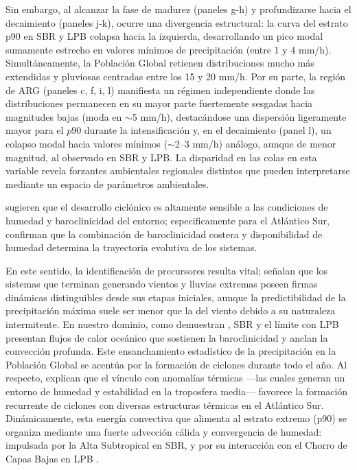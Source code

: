 Sin embargo, al alcanzar la fase de madurez (paneles g-h) y profundizarse hacia el decaimiento (paneles j-k), ocurre una divergencia estructural: la curva del estrato p90 en SBR y LPB colapsa hacia la izquierda, desarrollando un pico modal sumamente estrecho en valores mínimos de precipitación (entre 1 y 4 mm/h). 
Simultáneamente, la Población Global retienen distribuciones mucho más extendidas y pluviosas centradas entre los 15 y 20 mm/h. 
Por su parte, la región de ARG (paneles c, f, i, l) manifiesta un régimen independiente donde las distribuciones permanecen en su mayor parte fuertemente sesgadas hacia magnitudes bajas (moda en $\sim$5 mm/h), destacándose una dispersión ligeramente mayor para el $p90$ durante la intensificación y, en el decaimiento (panel l), un colapso modal hacia valores mínimos ($\sim$2--3 mm/h) análogo, aunque de menor magnitud, al observado en SBR y LPB.
La disparidad en las colas en esta variable revela forzantes ambientales regionales distintos que pueden interpretarse mediante un espacio de parámetros ambientales. 


\citet{yanase2014parameter} sugieren que el desarrollo ciclónico es altamente sensible a las condiciones de humedad y baroclinicidad del entorno; especificamente para el Atlántico Sur, \citet{gramcianinov2019properties} confirman que la combinación de baroclinicidad costera y disponibilidad de humedad determina la trayectoria evolutiva de los sistemas.

En este sentido, la identificación de precursores resulta vital; \citet{laurila2021characteristics} señalan que los sistemas %
que terminan generando vientos y lluvias extremas poseen firmas dinámicas distinguibles desde sus etapas iniciales, aunque la predictibilidad de la precipitación máxima suele ser menor que la del viento debido a su naturaleza intermitente. 
En nuestro dominio, como demuestran \citet{russo2025impacts}, SBR y el límite con LPB presentan flujos de calor oceánico que sostienen la baroclinicidad y anclan la convección profunda. 
Este ensanchamiento estadístico de la precipitación en la Población Global se acentúa por la formación de ciclones durante todo el año. Al respecto, \citet{evans2012climatology} explican que el vínculo con anomalías térmicas —las cuales generan un entorno de humedad y estabilidad en la troposfera media— favorece la formación recurrente de ciclones con diversas estructuras térmicas en el Atlántico Sur.
Dinámicamente, esta energía convectiva que alimenta al estrato extremo (p90) se organiza mediante una fuerte advección cálida y convergencia de humedad: impulsada por la Alta Subtropical en SBR, y por su interacción con el Chorro de Capas Bajas en LPB \citep{gramcianinov2024early}.

